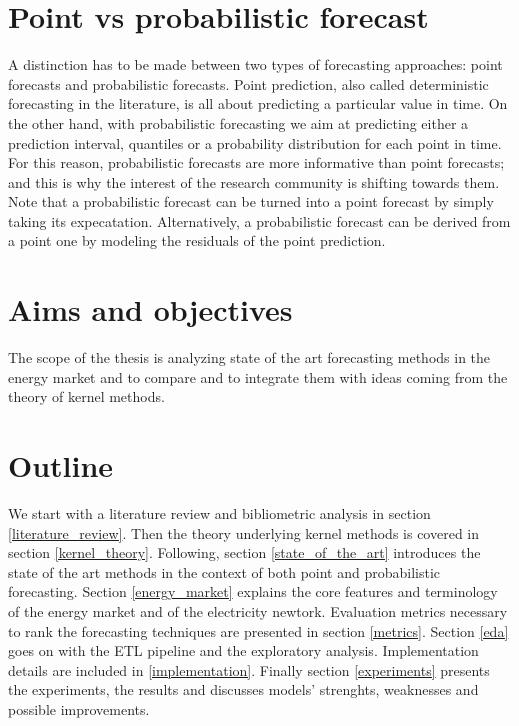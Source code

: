\section{Point vs probabilistic forecast}
A distinction has to be made between two types of forecasting approaches: point forecasts and probabilistic forecasts.
Point prediction, also called deterministic forecasting in the literature, is all about predicting a particular value in time.
On the other hand, with probabilistic forecasting we aim at predicting either a prediction interval, quantiles or a probability distribution for each point in time. For this reason, probabilistic forecasts are more informative than point forecasts; and this is why the interest of the research community is shifting towards them.
Note that a probabilistic forecast can be turned into a point forecast by simply taking its expecatation.
Alternatively, a probabilistic forecast can be derived from a point one by modeling the residuals of the point prediction.



\section{Aims and objectives}


The scope of the thesis is analyzing state of the art forecasting methods in the energy market and to compare and to integrate them with ideas coming from the theory of kernel methods.  



\section{Outline}
We start with a literature review and bibliometric analysis in section \ref{literature_review}.
Then the theory underlying kernel methods is covered in section \ref{kernel_theory}. Following, section \ref{state_of_the_art} introduces the state of the art methods in the context of both point and probabilistic forecasting. Section \ref{energy_market} explains the core features and terminology of the energy market and of the electricity newtork.
Evaluation metrics necessary to rank the forecasting techniques are presented in section \ref{metrics}. Section \ref{eda} goes on with the ETL pipeline and the exploratory analysis. 
Implementation details are included in \ref{implementation}.
Finally section \ref{experiments} presents the experiments, the results and discusses models' strenghts, weaknesses and possible improvements.